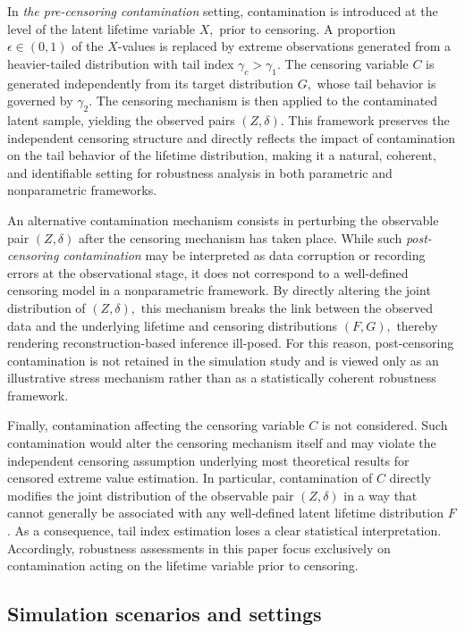 \documentclass[reqno,openbib,runningheads,a4paper,12pt]{amsart}%
\begin{document}
\noindent In \textit{the pre-censoring contamination} setting, contamination
is introduced at the level of the latent lifetime variable $X,$ prior to
censoring. A proportion $\epsilon\in(0,1)$ of the $X$-values is replaced by
extreme observations generated from a heavier-tailed distribution with tail
index $\gamma_{c}>\gamma_{1}.$ The censoring variable $C$ is generated
independently from its target distribution $G,$ whose tail behavior is
governed by $\gamma_{2}.$ The censoring mechanism is then applied to the
contaminated latent sample, yielding the observed pairs $(Z,\delta).$ This
framework preserves the independent censoring structure and directly reflects
the impact of contamination on the tail behavior of the lifetime distribution,
making it a natural, coherent, and identifiable setting for robustness
analysis in both parametric and nonparametric frameworks.\smallskip

\noindent An alternative contamination mechanism consists in perturbing the
observable pair $(Z,\delta)$ after the censoring mechanism has taken place.
While such \textit{post-censoring contamination} may be interpreted as data
corruption or recording errors at the observational stage, it does not
correspond to a well-defined censoring model in a nonparametric framework. By
directly altering the joint distribution of $(Z,\delta),$ this mechanism
breaks the link between the observed data and the underlying lifetime and
censoring distributions $(F,G),$ thereby rendering reconstruction-based
inference ill-posed. For this reason, post-censoring contamination is not
retained in the simulation study and is viewed only as an illustrative stress
mechanism rather than as a statistically coherent robustness
framework.\smallskip

\noindent Finally, contamination affecting the censoring variable $C$ is not
considered. Such contamination would alter the censoring mechanism itself and
may violate the independent censoring assumption underlying most theoretical
results for censored extreme value estimation. In particular, contamination of
$C$ directly modifies the joint distribution of the observable pair
$(Z,\delta)$ in a way that cannot generally be associated with any
well-defined latent lifetime distribution $F$. As a consequence, tail index
estimation loses a clear statistical interpretation. Accordingly, robustness
assessments in this paper focus exclusively on contamination acting on the
lifetime variable prior to censoring.

\subsection{Simulation scenarios and settings}
\end{document}
